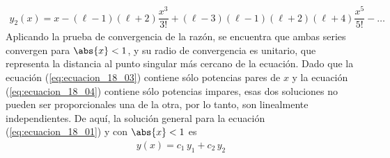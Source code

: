 \begin{align}
y_{2}(x) = x - (\ell - 1)(\ell + 2) \dfrac{x^{3}}{3!} + (\ell - 3) (\ell - 1)(\ell + 2)(\ell + 4) \dfrac{x^{5}}{5!} - \ldots
\label{eq:ecuacion_18_04}
\end{align}
Aplicando la prueba de convergencia de la razón, se encuentra que ambas series convergen para $\abs{x} < 1$, y su radio de convergencia es unitario, que representa la distancia al punto singular más cercano de la ecuación. Dado que la ecuación (\ref{eq:ecuacion_18_03}) contiene sólo potencias pares de $x$ y la ecuación (\ref{eq:ecuacion_18_04}) contiene sólo potencias impares, esas dos soluciones no pueden ser proporcionales una de la otra, por lo tanto, son linealmente independientes. De aquí, la solución general para la ecuación (\ref{eq:ecuacion_18_01}) y con $\abs{x} < 1$ es
\begin{align*}
y(x) = c_{1} \, y_{1} + c_{2} \, y_{2}
\end{align*}

